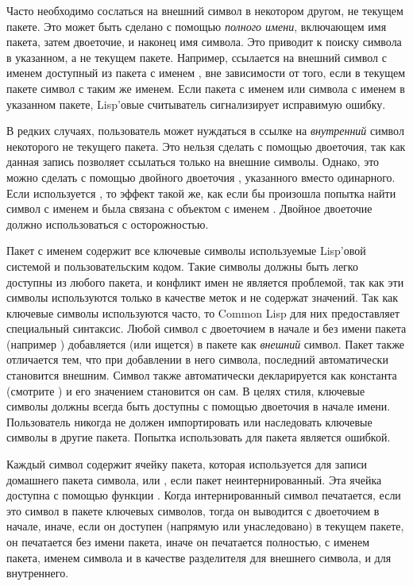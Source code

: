 Часто необходимо сослаться на внешний символ в некотором другом, не текущем
пакете. Это может быть сделано с помощью \emph{полного имени}, включающем имя
пакета, затем двоеточие, и наконец имя символа. Это приводит к поиску символа
в указанном, а не текущем пакете. Например,  ссылается на
внешний символ с именем  доступный из пакета с именем ,
вне зависимости от того, если в текущем пакете символ с таким же именем.
Если пакета с именем  или символа с именем  в указанном
пакете, Lisp'овые считыватель сигнализирует исправимую ошибку.

В редких случаях, пользователь может нуждаться в ссылке на \emph{внутренний}
символ некоторого не текущего пакета. Это нельзя сделать с помощью двоеточия,
так как данная запись позволяет ссылаться только на внешние символы. Однако, это
можно сделать с помощью двойного двоеточия \cd{::}, указанного вместо
одинарного. Если используется , то эффект такой же, как если
бы произошла попытка найти символ с именем  и  была
связана с объектом с именем . Двойное двоеточие должно использоваться
с осторожностью.

Пакет с именем  содержит все ключевые символы используемые
Lisp'овой системой и пользовательским кодом. Такие символы должны быть легко
доступны из любого пакета, и конфликт имен не является проблемой, так как эти
символы используются только в качестве меток и не содержат значений. Так как
ключевые символы используются часто, то Common Lisp для них предоставляет
специальный синтаксис. Любой символ с двоеточием в начале и без имени пакета
(например ) добавляется (или ищется) в пакете  как
\emph{внешний} символ. Пакет  также отличается тем, что при
добавлении в него символа, последний автоматически становится внешним. Символ
также автоматически декларируется как константа (смотрите ) и
его значением становится он сам.
В целях стиля, ключевые символы должны всегда быть доступны с помощью двоеточия
в начале имени. Пользователь никогда не должен импортировать или наследовать
ключевые символы в другие пакета. Попытка использовать  для
 пакета является ошибкой.

Каждый символ содержит ячейку пакета, которая используется для записи домашнего
пакета символа, или {\false}, если пакет неинтернированный. Эта ячейка доступна
с помощью функции .
Когда интернированный символ печатается, если это символ в пакете ключевых
символов, тогда он выводится с двоеточием в начале, иначе, если он доступен
(напрямую или унаследовано) в текущем пакете, он печатается без имени пакета,
иначе он печатается полностью, с именем пакета, именем символа и \cd{:} в
качестве разделителя для внешнего символа, и \cd{::} для внутреннего.

